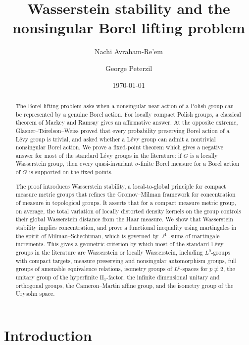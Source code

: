 \documentclass{amsart}
\author{Nachi Avraham-Re'em}
\author{George Peterzil}
\date{\today}
\title{Wasserstein stability and the nonsingular Borel lifting problem}
\numberwithin{equation}{subsection}
\theoremstyle{plain}
\theoremstyle{definition}
\theoremstyle{plain}
\begin{document}

\maketitle

\begin{abstract}
The Borel lifting problem asks when a nonsingular near action of a Polish group can be represented by a genuine Borel action. For locally compact Polish groups, a classical theorem of Mackey and Ramsay gives an affirmative answer. At the opposite extreme, Glasner--Tsirelson--Weiss proved that every probability preserving Borel action of a L\'{e}vy group is trivial, and asked whether a L\'{e}vy group can admit a nontrivial nonsingular Borel action. We prove a fixed-point theorem which gives a negative answer for most of the standard L\'{e}vy groups in the literature: if \(G\) is a locally Wasserstein group, then every quasi-invariant \(\sigma\)-finite Borel measure for a Borel action of \(G\) is supported on the fixed points.

\smallskip

The proof introduces Wasserstein stability, a local-to-global principle for compact measure metric groups that refines the Gromov--Milman framework for concentration of measure in topological groups. It asserts that for a compact measure metric group, on average, the total variation of locally distorted density kernels on the group controls their global Wasserstein distance from the Haar measure. We show that Wasserstein stability implies concentration, and prove a functional inequality using martingales in the spirit of Milman--Schechtman, which is governed by \(\ell^{1}\)-sums of martingale increments. This gives a geometric criterion by which most of the standard L\'{e}vy groups in the literature are Wasserstein or locally Wasserstein, including \(L^{0}\)-groups with compact targets, measure preserving and nonsingular automorphism groups, full groups of amenable equivalence relations, isometry groups of \(L^{p}\)-spaces for \(p\neq2\), the unitary group of the hyperfinite \(\mathrm{II}_{1}\)-factor, the infinite dimensional unitary and orthogonal groups, the Cameron--Martin affine group, and the isometry group of the Urysohn space.
\end{abstract}

\tableofcontents

\section{Introduction}
\end{document}
